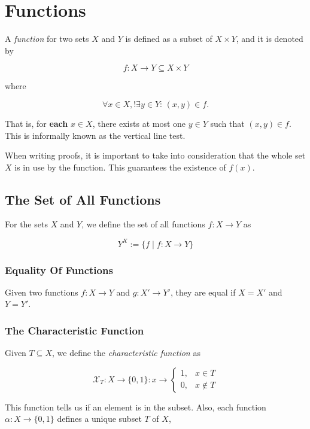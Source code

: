 \chapter{Functions}

A \emph{function} for two sets \(X\) and \(Y\) is defined as a subset of \(X \times Y\), and it is denoted by

\[
	f: X \to Y \subseteq X \times Y
\]

where

\[
	\forall x \in X, !\exists y \in Y: \, (x, y) \in f.
\]

That is, for \textbf{each} \(x \in X\), there exists at most one \(y \in Y\) such that \((x, y) \in f\).
This is informally known as the vertical line test.

When writing proofs, it is important to take into consideration that the whole set \(X\) is in use by the function. This guarantees
the existence of \(f(x)\).

\section{The Set of All Functions}

For the sets \(X\) and \(Y\), we define the set of all functions \(f: X \to Y\) as

\[
	Y^X := \{f \mid f: X \to Y\}
\]

\subsection{Equality Of Functions}

Given two functions \(f: X \to Y\) and \(g: X' \to Y'\), they are equal if \(X = X'\) and \(Y = Y'\).

\subsection{The Characteristic Function}

Given \(T \subseteq X\), we define the \emph{characteristic function} as

\[
	\mathcal{X}_T: X \to \{0,1\} : x \to \begin{cases}
		1, & x \in T    \\
		0, & x \notin T
	\end{cases}
\]

This function tells us if an element is in the subset. Also, each function \(\alpha : X \to \{0, 1\}\) defines a
unique subset \(T\) of \(X\),

